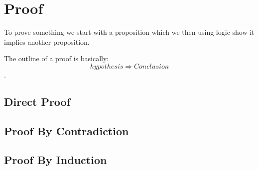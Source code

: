 \section{Proof}

To prove something we start with a proposition which we then using logic show it implies another proposition.

The outline of a proof is basically: $$hypothesis \Rightarrow Conclusion$$.

\subsection{Direct Proof}
\subsection{Proof By Contradiction}
\subsection{Proof By Induction}


\lipsum
